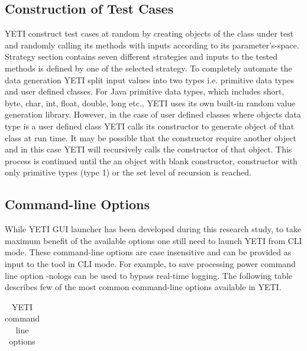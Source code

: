 {\subsection{Construction of Test Cases}
YETI construct test cases at random by creating objects of the class under test and randomly calling its methods with inputs according to its parameter's-space. Strategy section contains seven different strategies and inputs to the tested methods is defined by one of the selected strategy. To completely automate the data generation YETI   split input values into two types i.e. primitive data types and user defined classes. For Java primitive data types, which includes short, byte, char, int, float, double, long etc., YETI uses its own built-in random value generation library. However, in the case of user defined classes where objects data type is a user defined class YETI calls its constructor to generate object of that class at run time. It may be possible that the constructor require another object and in this case YETI will recursively calls the constructor of that object. This process is continued until the an object with blank constructor, constructor with only primitive types (type 1) or the set level of recursion is reached. 

\subsection{Command-line Options}
While YETI GUI launcher has been developed during this research study, to take maximum benefit of the available options one still need to launch YETI from CLI mode. These command-line options are case insensitive and can be provided as input to the tool in CLI mode. For example, to save processing power command line option -nologs can be used to bypass real-time logging. The following table describes few of the most common command-line options available in YETI.    

\begin{table}[h]
\caption{YETI command line options} %
\smallskip
\centering %
\begin{tabular}{ll } %
\hline


\end{tabular}
\end{table}}
